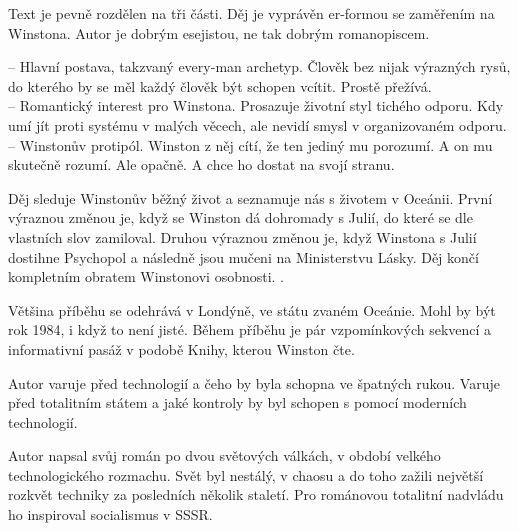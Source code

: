 \documentclass{extarticle} %
\begin{document}

\noindent
Text je pevně rozdělen na tři části. Děj je vyprávěn er-formou se zaměřením na Winstona. Autor je dobrým esejistou, ne tak dobrým romanopiscem.

\noindent
{} -- Hlavní postava, takzvaný every-man archetyp. Člověk bez nijak výrazných rysů, do kterého by se měl každý člověk být schopen vcítit. Prostě přežívá.\\
 -- Romantický interest pro Winstona. Prosazuje životní styl tichého odporu. Kdy umí jít proti systému v malých věcech, ale nevidí smysl v organizovaném odporu. \\
 -- Winstonův protipól. Winston z něj cítí, že ten jediný mu porozumí. A on mu skutečně rozumí. Ale opačně. A chce ho dostat na svojí stranu.

{\setlength{\parindent}{5pt}
Děj sleduje Winstonův běžný život a seznamuje nás s životem v Oceánii. První výraznou změnou je, když se Winston dá dohromady s Julií, do které se dle vlastních slov zamiloval. Druhou výraznou změnou je, když Winstona s Julií dostihne Psychopol a následně jsou mučeni na Ministerstvu Lásky. Děj končí kompletním obratem Winstonovi osobnosti. .
}

\noindent 
Většina příběhu se odehrává v Londýně, ve státu zvaném Oceánie. Mohl by být rok 1984, i když to není jisté. Během příběhu je pár vzpomínkových sekvencí a informativní pasáž v podobě Knihy, kterou Winston čte.

\noindent
Autor varuje před technologií a čeho by byla schopna ve špatných rukou. Varuje před totalitním státem a jaké kontroly by byl schopen s pomocí moderních technologií. 


Autor napsal svůj román po dvou světových válkách, v období velkého technologického rozmachu. Svět byl nestálý, v chaosu a do toho zažili největší rozkvět techniky za posledních několik staletí. Pro románovou totalitní nadvládu ho inspiroval socialismus v SSSR.



\end{document}

